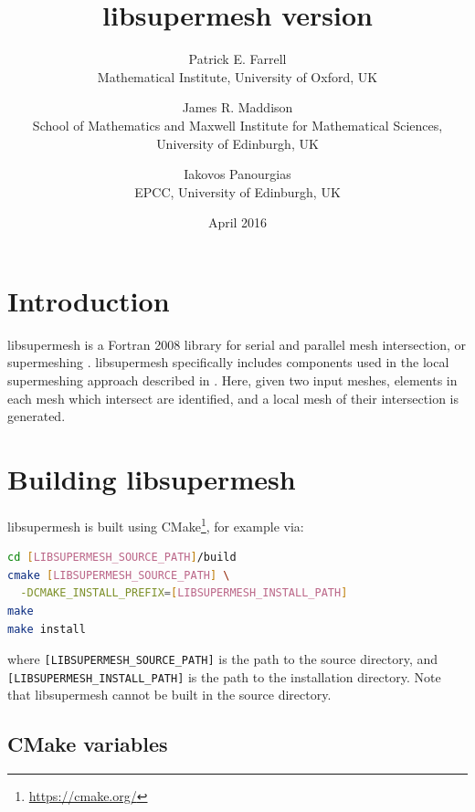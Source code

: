 \documentclass{article}
\begin{document}
\title{libsupermesh version \version}
\date{April 2016}
\author{Patrick E. Farrell \\ Mathematical Institute, University of Oxford, UK \\
   \and James R. Maddison \\ School of Mathematics and Maxwell Institute for Mathematical Sciences, \\ University of Edinburgh, UK \\
   \and Iakovos Panourgias \\ EPCC, University of Edinburgh, UK}

\maketitle

\tableofcontents

\section{Introduction}

libsupermesh is a Fortran 2008 library for serial and parallel mesh
intersection, or supermeshing \citep{farrell2009,farrell2009a}. libsupermesh
specifically includes components used in the local supermeshing approach
described in \citet{farrell2011} \citep[see also][]{gander2009,gander2013}.
Here, given two input meshes, elements in each mesh which intersect are
identified, and a local mesh of their intersection is generated.

\section{Building libsupermesh}

libsupermesh is built using CMake\footnote{\url{https://cmake.org/}}, for
example via:
\begin{lstlisting}[language=sh,frame=single]
cd [LIBSUPERMESH_SOURCE_PATH]/build
cmake [LIBSUPERMESH_SOURCE_PATH] \
  -DCMAKE_INSTALL_PREFIX=[LIBSUPERMESH_INSTALL_PATH]
make
make install
\end{lstlisting}
where \verb+[LIBSUPERMESH_SOURCE_PATH]+ is the path to the source directory, and
\linebreak \verb+[LIBSUPERMESH_INSTALL_PATH]+ is the path to the installation
directory. Note that libsupermesh cannot be built in the source directory.

\subsection*{CMake variables}
\end{document}
